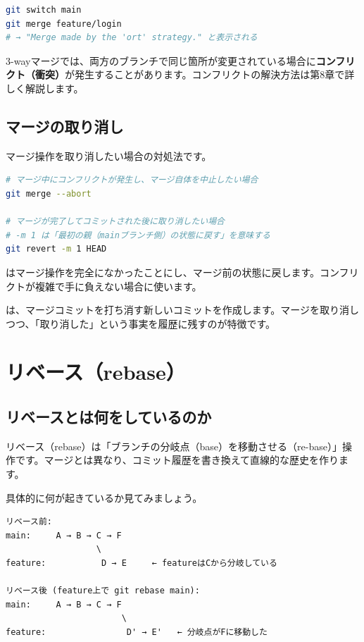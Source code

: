 \begin{lstlisting}[language=bash]
git switch main
git merge feature/login
# → "Merge made by the 'ort' strategy." と表示される
\end{lstlisting}

3-wayマージでは、両方のブランチで同じ箇所が変更されている場合に\textbf{コンフリクト（衝突）}が発生することがあります。コンフリクトの解決方法は第8章で詳しく解説します。

\subsection{マージの取り消し}

マージ操作を取り消したい場合の対処法です。

\begin{lstlisting}[language=bash]
# マージ中にコンフリクトが発生し、マージ自体を中止したい場合
git merge --abort

# マージが完了してコミットされた後に取り消したい場合
# -m 1 は「最初の親（mainブランチ側）の状態に戻す」を意味する
git revert -m 1 HEAD
\end{lstlisting}

 はマージ操作を完全になかったことにし、マージ前の状態に戻します。コンフリクトが複雑で手に負えない場合に使います。

 は、マージコミットを打ち消す新しいコミットを作成します。マージを取り消しつつ、「取り消した」という事実を履歴に残すのが特徴です。

\section{リベース（rebase）}

\subsection{リベースとは何をしているのか}

リベース（rebase）は「ブランチの分岐点（base）を移動させる（re-base）」操作です。マージとは異なり、コミット履歴を書き換えて直線的な歴史を作ります。

具体的に何が起きているか見てみましょう。

\begin{lstlisting}[language={}]
リベース前:
main:     A → B → C → F
                  \
feature:           D → E     ← featureはCから分岐している

リベース後 (feature上で git rebase main):
main:     A → B → C → F
                       \
feature:                D' → E'   ← 分岐点がFに移動した
\end{lstlisting}

